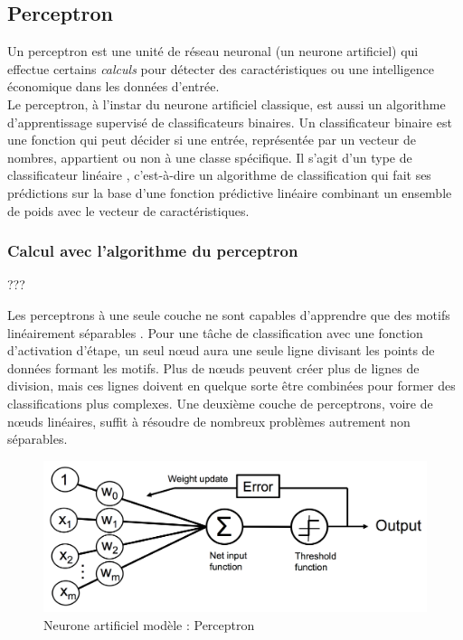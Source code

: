 	\subsection{Perceptron} \label{sec:perceptron}
	Un perceptron est une unité de réseau neuronal (un neurone artificiel) qui effectue certains \textit{calculs} pour détecter des caractéristiques ou une intelligence économique dans les données d'entrée.\\ 
	Le perceptron, à l'instar du neurone artificiel classique, est aussi un algorithme d'apprentissage supervisé de classificateurs binaires. Un classificateur binaire est une fonction qui peut décider si une entrée, représentée par un vecteur de nombres, appartient ou non à une classe spécifique. Il s'agit d'un type de classificateur linéaire , c'est-à-dire un algorithme de classification qui fait ses prédictions sur la base d'une fonction prédictive linéaire combinant un ensemble de poids avec le vecteur de caractéristiques.
	
	\subsubsection{Calcul avec l'algorithme du perceptron}
	???
	
	Les perceptrons à une seule couche ne sont capables d'apprendre que des motifs linéairement séparables . Pour une tâche de classification avec une fonction d'activation d'étape, un seul nœud aura une seule ligne divisant les points de données formant les motifs. Plus de nœuds peuvent créer plus de lignes de division, mais ces lignes doivent en quelque sorte être combinées pour former des classifications plus complexes. Une deuxième couche de perceptrons, voire de nœuds linéaires, suffit à résoudre de nombreux problèmes autrement non séparables.

	\begin{figure}[hth]%
		\centering
		\includegraphics[width=\textwidth]{images/perceptron_neuron.png}
		\caption{Neurone artificiel modèle : Perceptron \cite[][]{ml2008python}
		}
		\label{fig:perceptron_neuron}
	\end{figure}

